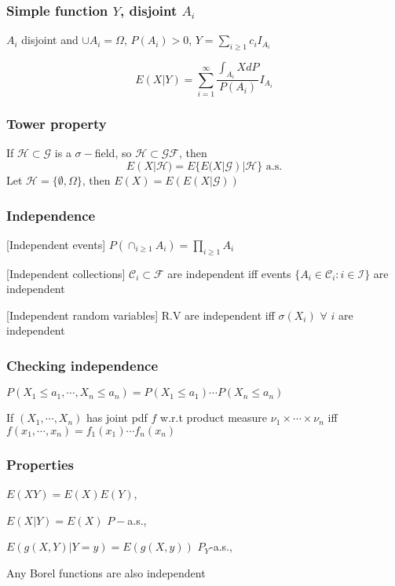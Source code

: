 \subsubsection{Simple function $Y$, disjoint $A_i$}
$A_i$ disjoint and $\cup A_i=\Omega$, $P(A_i)>0$, $Y=\sum_{i\geq1}c_i I_{A_i}$

$$
E(X|Y) = \sum_{i=1}^\infty \frac{\int_{A_i} X dP}{P(A_i)}I_{A_i}
$$

\subsubsection{Tower property}

If $\mathcal{H}\subset\mathcal{G}$ is a $\sigma-$field, so $\mathcal{H}\subset\mathcal{G}\mathcal{F}$, then
$$
E(X|\mathcal{H})=E\{E(X|\mathcal{G})|\mathcal{H}\} \text{ a.s.}
$$
Let $\mathcal{H}=\{\emptyset, \Omega\}$, then $E(X)=E(E(X|\mathcal{G}))$

\subsubsection{Independence}

[Independent events]
$P(\cap_{i\geq 1} A_i)=\prod_{i\geq 1}A_i$

[Independent collections]
$\mathcal{C}_i\subset \mathcal{F}$ are independent iff events $\{A_i\in \mathcal{C}_i:i\in \mathcal{I}\}$ are independent

[Independent random variables]
R.V are independent iff $\sigma(X_i)$ $\forall$ $i$ are independent 

\subsubsection{Checking independence}
$P(X_1\leq a_1, \cdots, X_n \leq a_n) = P(X_1\leq a_1)\cdots P(X_n\leq a_n)$

If $(X_1, \cdots, X_n)$ has joint pdf $f$ w.r.t product measure $\nu_1\times \cdots \times \nu_n$ iff $f(x_1, \cdots, x_n) = f_1(x_1)\cdots f_n(x_n)$

\subsubsection{Properties}
$E(XY)=E(X)E(Y)$,

$E(X|Y)=E(X)$ $P-$a.s.,

$E(g(X,Y)|Y=y)=E(g(X, y))$ $P_Y$-a.s.,

Any Borel functions are also independent

